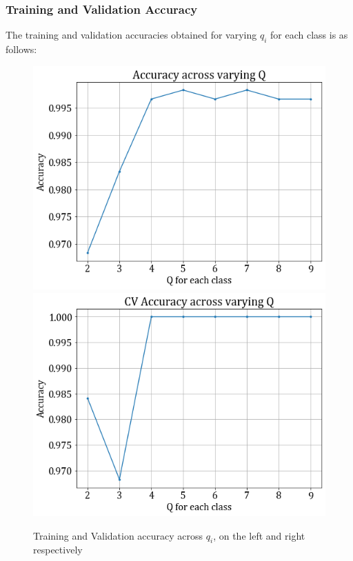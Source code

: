 \documentclass[11pt,a4paper]{article}
\begin{document}
\subsubsection{Training and Validation Accuracy}
The training and validation accuracies obtained for varying $q_i$ for each class is as follows:
\begin{figure}[H]
    \hspace{-2em}
    \includegraphics[scale=0.5]{images/1b_full_train.png}
    \includegraphics[scale=0.5]{images/1b_full_val.png}
    \caption{Training and Validation accuracy across $q_i$, on the left and right respectively}
\end{figure}
\end{document}
